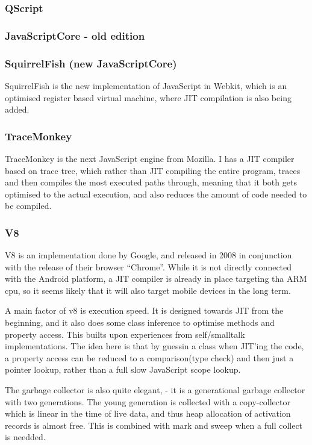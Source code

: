 \subsubsection{QScript}
\subsubsection{JavaScriptCore - old edition}
\subsubsection{SquirrelFish (new JavaScriptCore)}
SquirrelFish is the new implementation of JavaScript in Webkit,
which is an optimised register based virtual machine,
where JIT compilation is also being added.

\subsubsection{TraceMonkey}
TraceMonkey is the next JavaScript engine from Mozilla.
I has a JIT compiler based on trace tree, 
which rather than JIT compiling the entire program,
traces and then compiles the most executed paths through,
meaning that it both gets optimised to the actual execution,
and also reduces the amount of code needed to be compiled.


\subsubsection{V8}
V8 is an implementation done by Google, and released in 2008 in conjunction with the release of their browser ``Chrome''. 
While it is not directly connected with the Android platform, a JIT compiler is already in place targeting tha ARM cpu, so it seems likely that it will also target mobile devices in the long term.

A main factor of v8 is execution speed. It is designed towards JIT from the beginning, and it also does some class inference to optimise methods and property access.
This builts upon experiences from self/smalltalk implementations\cite{articles-before-v8}.
The idea here is that by guessin a class when JIT'ing the code, a property access can be reduced to a comparison(type check) and then just a pointer lookup, rather than a full slow JavaScript scope lookup.

The garbage collector is also quite elegant, - it is a generational garbage collector with two generations. The young generation is collected with a copy-collector which is linear in the time of live data, and thus heap allocation of activation records is almost free. 
This is combined with mark and sweep when a full collect is needded.


